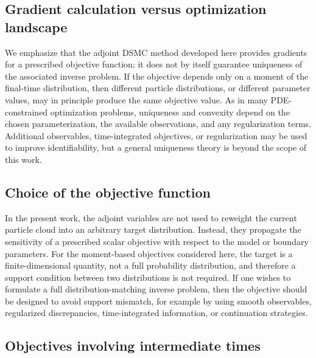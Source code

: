 \documentclass[12pt,nopreprintline]{elsarticle}
\begin{document}
{\subsection{Gradient calculation versus optimization landscape}
We emphasize that the adjoint DSMC method developed here provides gradients for a prescribed objective function; it does not by itself guarantee uniqueness of the associated inverse problem. If the objective depends only on a moment of the final-time distribution, then different particle distributions, or different parameter values, may in principle produce the same objective value. As in many PDE-constrained optimization problems, uniqueness and convexity depend on the chosen parameterization, the available observations, and any regularization terms. Additional observables, time-integrated objectives, or regularization may be used to improve identifiability, but a general uniqueness theory is beyond the scope of this work.

\subsection{Choice of the objective function} In the present work, the adjoint variables are not used to reweight the current particle cloud into an arbitrary target distribution. Instead, they propagate the sensitivity of a prescribed scalar objective with respect to the model or boundary parameters. For the moment-based objectives considered here, the target is a finite-dimensional quantity, not a full probability distribution, and therefore a support condition between two distributions is not required. If one wishes to formulate a full distribution-matching inverse problem, then the objective should be designed to avoid support mismatch, for example by using smooth observables, regularized discrepancies, time-integrated information, or continuation strategies.

\subsection{Objectives involving intermediate times}
\label{sec:time_integrated_objective}

}
\end{document}
